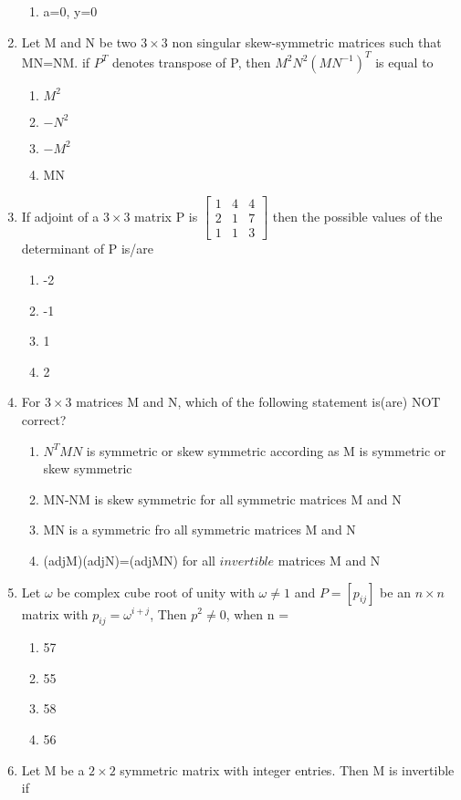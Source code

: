 \begin{enumerate}[label=\arabic*.,ref=\thesubsection.\theenumi]
\begin{enumerate}
 \item a=0, y=0
\end{enumerate}
\item Let M and N be two $3\times3$ non singular skew-symmetric matrices such that MN=NM. if $P^T$ denotes transpose of P, then $M^2N^2(MN^{-1})^T$ is equal to
\begin{enumerate}
 \item $M^2$
 \item $-N^2$
 \item $-M^2$
 \item  MN
\end{enumerate}
\item If adjoint of a $3\times3$ matrix P is $\begin{bmatrix} 1 & 4 & 4  \\ 2 & 1 & 7 \\ 1 & 1 & 3 \end{bmatrix}$ then the possible values of the determinant of P is/are
\begin{enumerate}
 \item -2
 \item -1
 \item  1
 \item  2
\end{enumerate}
\item For $3\times3$ matrices M and N, which of the following statement is(are) NOT correct?
\begin{enumerate}
 \item $N^TMN$ is symmetric or skew symmetric according as M is symmetric or skew symmetric
 \item MN-NM is skew symmetric for all symmetric matrices M and N
 \item MN is a symmetric fro all symmetric matrices M and N
 \item (adjM)(adjN)=(adjMN) for all $invertible$ matrices M and N
\end{enumerate}
\item Let $\omega$ be complex cube root of unity with $\omega\neq 1$ and $P=[p_{ij}]$ be an $n\times n$ matrix with $p_{ij}=\omega^{i+j}$, Then $p^2\neq0$, when n =
\begin{enumerate}
 \item 57
 \item 55
 \item 58
 \item  56
\end{enumerate}
\item Let M be a $2\times2$ symmetric matrix with integer entries. Then M is invertible if

\end{enumerate}
